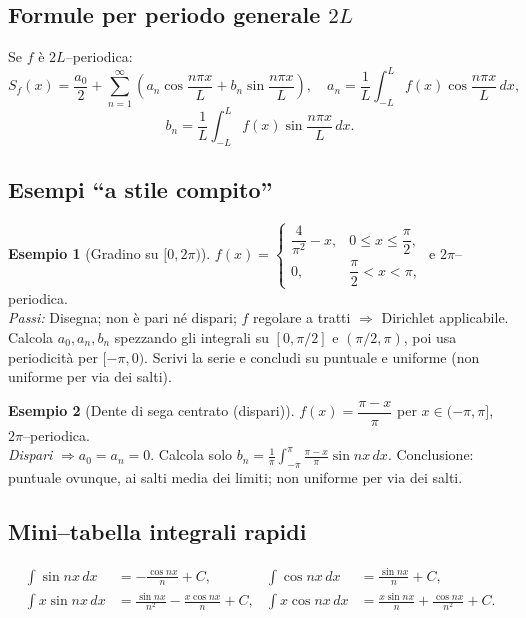 \documentclass[11pt,a4paper]{article}
\theoremstyle{definition}
\newtheorem{example}{Esempio}
\begin{document}
\subsection{Formule per periodo generale $2L$}
Se $f$ è $2L$–periodica:
\[
S_f(x)=\frac{a_0}{2}+\sum_{n=1}^\infty\left(a_n\cos\frac{n\pi x}{L}+b_n\sin\frac{n\pi x}{L}\right),
\quad
a_n=\frac{1}{L}\int_{-L}^{L} f(x)\cos\frac{n\pi x}{L}\,dx,
\]
\[
b_n=\frac{1}{L}\int_{-L}^{L} f(x)\sin\frac{n\pi x}{L}\,dx.
\]

\subsection{Esempi “a stile compito”}

\begin{example}[Gradino su $[0,2\pi)$]
$f(x)=\begin{cases}\dfrac{4}{\pi^2}-x,&0\le x\le \dfrac{\pi}{2},\\[0.3em]
0,&\dfrac{\pi}{2}<x<\pi,
\end{cases}$
e $2\pi$–periodica.\\
\emph{Passi:} Disegna; non è pari né dispari; $f$ regolare a tratti $\Rightarrow$ Dirichlet applicabile. 
Calcola $a_0,a_n,b_n$ spezzando gli integrali su $[0,\pi/2]$ e $(\pi/2,\pi)$, poi usa periodicità per $[-\pi,0)$. 
Scrivi la serie e concludi su puntuale e uniforme (non uniforme per via dei salti).
\end{example}

\begin{example}[Dente di sega centrato (dispari)]
$f(x)=\dfrac{\pi-x}{\pi}$ per $x\in(-\pi,\pi]$, $2\pi$–periodica.\\
\emph{Dispari} $\Rightarrow a_0=a_n=0$. Calcola solo $b_n=\frac{1}{\pi}\int_{-\pi}^{\pi}\frac{\pi-x}{\pi}\sin nx\,dx$.
Conclusione: puntuale ovunque, ai salti media dei limiti; non uniforme per via dei salti.
\end{example}

\subsection{Mini–tabella integrali rapidi}
\begin{align*}
\int \sin nx\,dx&=-\frac{\cos nx}{n}+C,&
\int \cos nx\,dx&=\frac{\sin nx}{n}+C,\\
\int x\sin nx\,dx&=\frac{\sin nx}{n^2}-\frac{x\cos nx}{n}+C,&
\int x\cos nx\,dx&=\frac{x\sin nx}{n}+\frac{\cos nx}{n^2}+C.
\end{align*}
\end{document}
